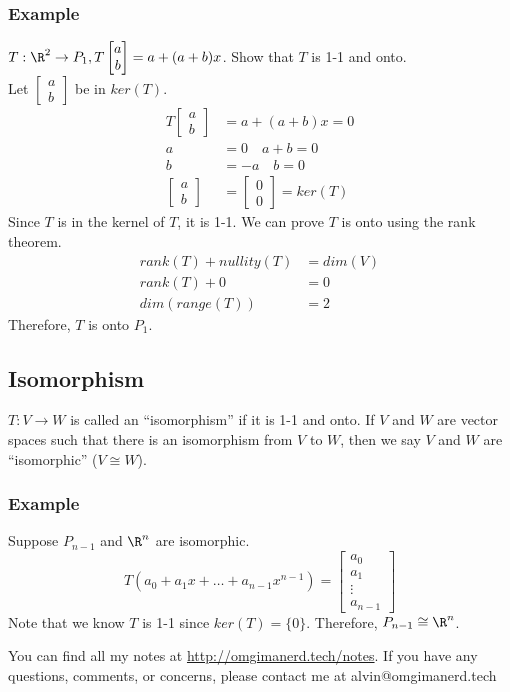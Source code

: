 \documentclass{math}
\begin{document}
\subsubsection*{Example}
\( T:\R^2\to P_1, T\begin{bmatrix}a \\ b\end{bmatrix} = a+(a+b)x \). Show that
\( T \) is 1-1 and onto. \\
Let \( \begin{bmatrix}a \\ b\end{bmatrix} \) be in \( ker(T) \).
\begin{align*}
  T\begin{bmatrix}a \\ b\end{bmatrix} &= a+(a+b)x = 0 \\
  a &= 0 \quad a+b = 0 \\
  b &= -a \quad b = 0 \\
  \begin{bmatrix}a \\ b\end{bmatrix} &= \begin{bmatrix}0 \\ 0\end{bmatrix} =
    ker(T)
\end{align*}
Since \( T \) is in the kernel of \( T \), it is 1-1. We can prove \( T \) is
onto using the rank theorem.
\begin{align*}
  rank(T)+nullity(T) &= dim(V) \\
  rank(T)+0 &= 0 \\
  dim(range(T)) &= 2
\end{align*}
Therefore, \( T \) is onto \( P_1 \).

\subsection*{Isomorphism}
\( T:V\to W \) is called an ``isomorphism'' if it is 1-1 and onto. If \( V \)
and \( W \) are vector spaces such that there is an isomorphism from \( V \) to
\( W \), then we say \( V \) and \( W \) are ``isomorphic'' (\( V\cong W \)).

\subsubsection*{Example}
Suppose \( P_{n-1} \) and \( \R^n \) are isomorphic.
\[ T(a_0+a_1x+\dots+a_{n-1}x^{n-1}) = \begin{bmatrix}a_0 \\ a_1 \\ \vdots \\
  a_{n-1}\end{bmatrix} \]
Note that we know \( T \) is 1-1 since \( ker(T) = \{0\} \). Therefore,
\( P_{n-1} \cong \R^n \).

\begin{center}
  You can find all my notes at \url{http://omgimanerd.tech/notes}. If you have
  any questions, comments, or concerns, please contact me at
  alvin@omgimanerd.tech
\end{center}
\end{document}
